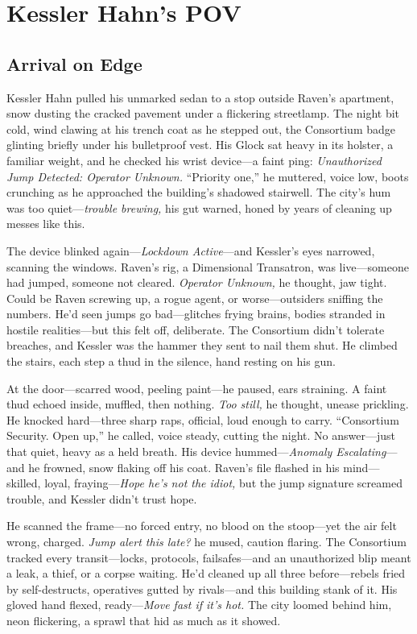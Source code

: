 \documentclass[12pt]{book}
\begin{document}
\chapter{Kessler Hahn’s POV}

\section{Arrival on Edge}

Kessler Hahn pulled his unmarked sedan to a stop outside Raven’s apartment, snow dusting the cracked pavement under a flickering streetlamp. The night bit cold, wind clawing at his trench coat as he stepped out, the Consortium badge glinting briefly under his bulletproof vest. His Glock sat heavy in its holster, a familiar weight, and he checked his wrist device—a faint ping: \textit{Unauthorized Jump Detected: Operator Unknown.} “Priority one,” he muttered, voice low, boots crunching as he approached the building’s shadowed stairwell. The city’s hum was too quiet—\textit{trouble brewing,} his gut warned, honed by years of cleaning up messes like this.

The device blinked again—\textit{Lockdown Active}—and Kessler’s eyes narrowed, scanning the windows. Raven’s rig, a Dimensional Transatron, was live—someone had jumped, someone not cleared. \textit{Operator Unknown,} he thought, jaw tight. Could be Raven screwing up, a rogue agent, or worse—outsiders sniffing the numbers. He’d seen jumps go bad—glitches frying brains, bodies stranded in hostile realities—but this felt off, deliberate. The Consortium didn’t tolerate breaches, and Kessler was the hammer they sent to nail them shut. He climbed the stairs, each step a thud in the silence, hand resting on his gun.

At the door—scarred wood, peeling paint—he paused, ears straining. A faint thud echoed inside, muffled, then nothing. \textit{Too still,} he thought, unease prickling. He knocked hard—three sharp raps, official, loud enough to carry. “Consortium Security. Open up,” he called, voice steady, cutting the night. No answer—just that quiet, heavy as a held breath. His device hummed—\textit{Anomaly Escalating}—and he frowned, snow flaking off his coat. Raven’s file flashed in his mind—skilled, loyal, fraying—\textit{Hope he’s not the idiot,} but the jump signature screamed trouble, and Kessler didn’t trust hope.

He scanned the frame—no forced entry, no blood on the stoop—yet the air felt wrong, charged. \textit{Jump alert this late?} he mused, caution flaring. The Consortium tracked every transit—locks, protocols, failsafes—and an unauthorized blip meant a leak, a thief, or a corpse waiting. He’d cleaned up all three before—rebels fried by self-destructs, operatives gutted by rivals—and this building stank of it. His gloved hand flexed, ready—\textit{Move fast if it’s hot.} The city loomed behind him, neon flickering, a sprawl that hid as much as it showed.
\end{document}
